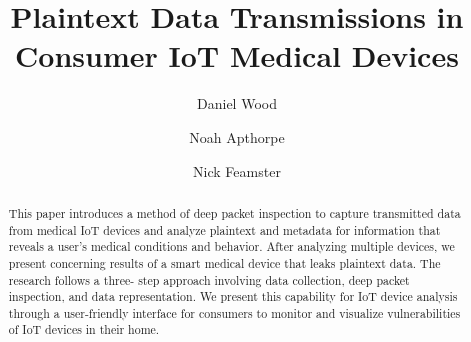 \documentclass[sigconf]{acmart}
\begin{document}
\title{Plaintext Data Transmissions in Consumer IoT Medical Devices} %
\author{Daniel Wood}
\author{Noah Apthorpe}
\author{Nick Feamster}

\renewcommand{\shortauthors}{D. Wood et al.}


\begin{abstract} 
This paper introduces a method of deep packet inspection to
capture transmitted data from medical IoT devices and analyze plaintext and
metadata for information that reveals a user's medical conditions and
behavior. After analyzing multiple devices, we present concerning results of a
smart medical device that leaks plaintext data. The research follows a three-
step approach involving data collection, deep packet inspection, and data
representation. We present this capability for IoT device analysis
through a
user-friendly interface for consumers to monitor and visualize vulnerabilities
of IoT devices in their home.  
\end{abstract}


\maketitle



\balance
\end{document}
